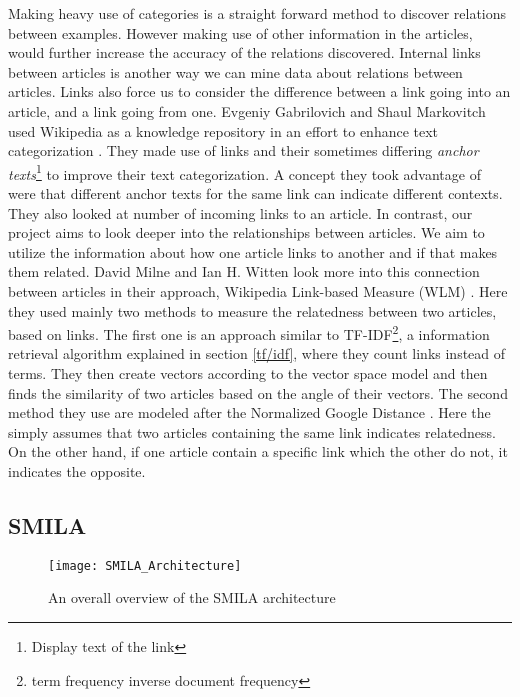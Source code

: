 Making heavy use of categories is a straight forward method to discover relations between examples. However making use of other information in the articles, would further increase the accuracy of the relations discovered. Internal links between articles is another way we can mine data about relations between articles. Links also force us to consider the difference between a link going into an article, and a link going from one. Evgeniy Gabrilovich and Shaul Markovitch used Wikipedia as a knowledge repository in an effort to enhance text categorization  \cite{text-cat}. They made use of links and their sometimes differing \textit{anchor texts}\footnote{Display text of the link} to improve their text categorization. A concept they took advantage of were that different anchor texts for the same link can indicate different contexts.  They also looked at number of incoming links to an article. In contrast, our project aims to look deeper into the relationships between articles. We aim to utilize the information about how one article links to another and if that makes them related. David Milne and Ian H. Witten look more into this connection between articles in their approach,  Wikipedia Link-based Measure (WLM) \cite{wlm}. Here they used mainly two methods to measure the relatedness between two articles, based on links. The first one is an approach similar to TF-IDF\footnote{term frequency inverse document frequency}, a information retrieval algorithm explained in section \ref{tf/idf}, where they count links instead of terms. They then create vectors according to the vector space model and then finds the similarity of two articles based on the angle of their vectors. The second method they use are modeled after the Normalized Google Distance  \cite{gsd}. Here the simply assumes that two articles containing the same link indicates relatedness. On the other hand, if one article contain a specific link which the other do not, it indicates the opposite.

\subsection{SMILA} \label{smila}

\begin{figure}[h]
\caption{An overall overview of the SMILA architecture}
\texttt{[image: SMILA\_Architecture]}
\end{figure}



